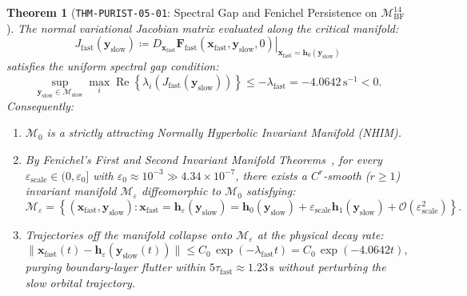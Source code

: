 \documentclass[11pt,a4paper,reqno]{article}
\theoremstyle{plain}
\newtheorem{theorem}{Theorem}[section]
\theoremstyle{definition}
\theoremstyle{remark}
\numberwithin{equation}{section}
\begin{document}
\begin{theorem}[\texttt{THM-PURIST-05-01}: Spectral Gap and Fenichel Persistence on $\mathcal{M}_{\mathrm{BF}}^{14}$]
\label{thm:fenichel_persistence}
The normal variational Jacobian matrix evaluated along the critical manifold:
\begin{equation}
  J_{\mathrm{fast}}(\bm{y}_{\mathrm{slow}}) \coloneqq \left. D_{\bm{x}_{\mathrm{fast}}} \bm{F}_{\mathrm{fast}}(\bm{x}_{\mathrm{fast}}, \bm{y}_{\mathrm{slow}}, 0) \right|_{\bm{x}_{\mathrm{fast}} = \bm{h}_0(\bm{y}_{\mathrm{slow}})}
\end{equation}
satisfies the uniform spectral gap condition:
\begin{equation}
  \sup_{\bm{y}_{\mathrm{slow}} \in \mathcal{M}_{\mathrm{slow}}} \max_{i} \operatorname{Re}\left\{ \lambda_i\left(J_{\mathrm{fast}}(\bm{y}_{\mathrm{slow}})\right) \right\} \le -\lambda_{\mathrm{fast}} = -4.0642\,\mathrm{s}^{-1} < 0.
  \label{eq:spectral_gap}
\end{equation}
Consequently:
\begin{enumerate}[label=(\roman*),leftmargin=1.8em]
  \item $\mathcal{M}_0$ is a strictly attracting Normally Hyperbolic Invariant Manifold (NHIM).
  \item By Fenichel's First and Second Invariant Manifold Theorems~\cite{fenichel1979}, for every $\varepsilon_{\mathrm{scale}} \in (0, \varepsilon_0]$ with $\varepsilon_0 \approx 10^{-3} \gg 4.34 \times 10^{-7}$, there exists a $C^r$-smooth ($r \ge 1$) invariant manifold $\mathcal{M}_{\varepsilon}$ diffeomorphic to $\mathcal{M}_0$ satisfying:
  \begin{equation}
    \mathcal{M}_{\varepsilon} = \left\{ (\bm{x}_{\mathrm{fast}}, \bm{y}_{\mathrm{slow}}) : \bm{x}_{\mathrm{fast}} = \bm{h}_\varepsilon(\bm{y}_{\mathrm{slow}}) = \bm{h}_0(\bm{y}_{\mathrm{slow}}) + \varepsilon_{\mathrm{scale}} \bm{h}_1(\bm{y}_{\mathrm{slow}}) + \mathcal{O}(\varepsilon_{\mathrm{scale}}^2) \right\}.
  \end{equation}
  \item Trajectories off the manifold collapse onto $\mathcal{M}_{\varepsilon}$ at the physical decay rate:
  \begin{equation}
    \|\bm{x}_{\mathrm{fast}}(t) - \bm{h}_\varepsilon(\bm{y}_{\mathrm{slow}}(t))\| \le C_0 \, \exp(-\lambda_{\mathrm{fast}} t) = C_0 \, \exp(-4.0642 t),
  \end{equation}
  purging boundary-layer flutter within $5 \tau_{\mathrm{fast}} \approx 1.23\,\mathrm{s}$ without perturbing the slow orbital trajectory.
\end{enumerate}
\end{theorem}
\end{document}
